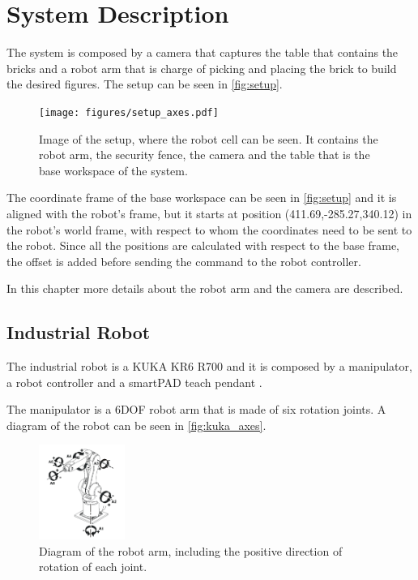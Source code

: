 \chapter{System Description}\label{chap:systemDescription}
The system is composed by a camera that captures the table that contains the bricks and a robot arm that is charge of picking and placing the brick to build the desired figures. The setup can be seen in \autoref{fig:setup}.
\begin{figure}[H]
    \texttt{[image: figures/setup\_axes.pdf]}
    \caption{Image of the setup, where the robot cell can be seen. It contains the robot arm, the security fence, the camera and the table that is the base workspace of the system. }
    \label{fig:setup}
\end{figure}

The coordinate frame of the base workspace can be seen in \autoref{fig:setup} and it is aligned with the robot's frame, but it starts at position (411.69,-285.27,340.12) in the robot's world frame, with respect to whom the coordinates need to be sent to the robot. Since all the positions are calculated with respect to the base frame, the offset is added before sending the command to the robot controller.
  
In this chapter more details about the robot arm and the camera are described. 

\section{Industrial Robot}
The industrial robot is a KUKA KR6 R700 and it is composed by a manipulator, a robot controller and a smartPAD teach pendant \cite{kuka}. 

The manipulator is a 6DOF robot arm that is made of six rotation joints. A diagram of the robot can be seen in \autoref{fig:kuka_axes}.
\begin{figure}[H]
    \includegraphics[width=0.25\textwidth]{figures/kuka_axes.png}
    \caption{Diagram of the robot arm, including the positive direction of rotation of each joint.\cite{kuka} }
    \label{fig:kuka_axes}
\end{figure}

